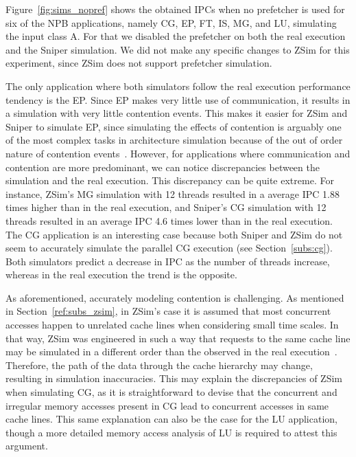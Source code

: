 \documentclass[AMA,final,STIX1COL]{WileyNJD-v2}
\begin{document}
Figure~\ref{fig:sims_nopref} shows the obtained IPCs when no prefetcher is used for six of the NPB applications, namely CG, EP, FT, IS, MG, and LU, simulating the input class A.
For that we disabled the prefetcher on both the real execution and the Sniper simulation. 
We did not make any specific changes to ZSim for this experiment, since ZSim does not support prefetcher simulation.



The only application where both simulators follow the real execution performance tendency is the EP. Since EP makes very little use of communication, it results in a simulation with very little contention events. 
This makes it easier for ZSim and Sniper to simulate EP, since simulating the effects of contention is arguably one of the most complex tasks in architecture simulation because of the out of order nature of contention events~\cite{sanchez2013zsim}.
However, for applications where communication and contention are more predominant, we can notice discrepancies between the simulation and the real execution. 
This discrepancy can be quite extreme. For instance, ZSim's MG simulation with 12 threads resulted in a average IPC 1.88 times higher than in the real execution, and Sniper's CG simulation with 12 threads resulted in an average IPC 4.6 times lower than in the real execution. 
The CG application is an interesting case because both Sniper and ZSim do not seem to accurately simulate the parallel CG execution (see Section~\ref{subs:cg}).
Both simulators predict a decrease in IPC as the number of threads increase, whereas in the real execution the trend is the opposite.




As aforementioned, accurately modeling contention is challenging. 
As mentioned in Section~\ref{ref:subs_zsim}, in ZSim's case it is assumed that most concurrent accesses happen to unrelated cache lines when considering small time scales. 
In that way, ZSim was engineered in such a way that requests to the same cache line may be simulated in a different order than the observed in the real execution~\cite{sanchez2013zsim}.
Therefore, the path of the data through the cache hierarchy may change, resulting in simulation inaccuracies.
This may explain the discrepancies of ZSim when simulating CG, as it is straightforward to devise that the concurrent and irregular memory accesses present in CG lead to concurrent accesses in same cache lines.
This same explanation can also be the case for the LU application, though a more detailed memory access analysis of LU is required to attest this argument.
\end{document}
